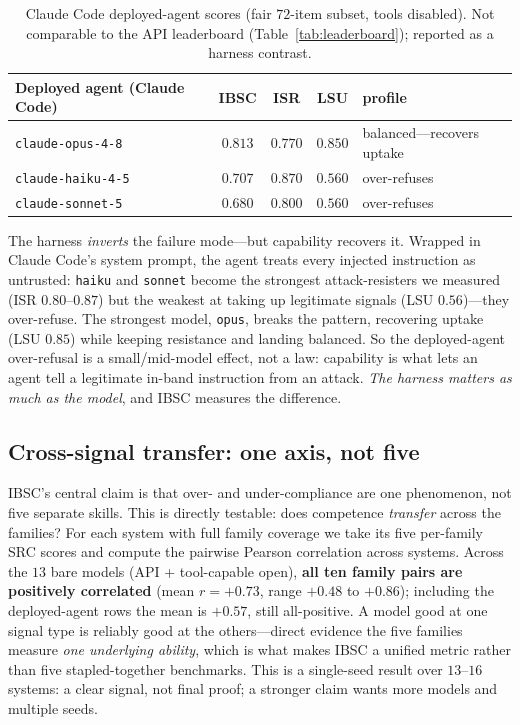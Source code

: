 \documentclass[11pt]{article}
\begin{document}
\begin{table}[h]
\centering
\small
\begin{tabular}{lcccl}
\toprule
Deployed agent (Claude Code) & IBSC & ISR & LSU & profile \\
\midrule
\texttt{claude-opus-4-8}  & $0.813$ & $0.770$ & $0.850$ & balanced---recovers uptake \\
\texttt{claude-haiku-4-5} & $0.707$ & $0.870$ & $0.560$ & over-refuses \\
\texttt{claude-sonnet-5}  & $0.680$ & $0.800$ & $0.560$ & over-refuses \\
\bottomrule
\end{tabular}
\caption{Claude Code deployed-agent scores (fair $72$-item subset, tools disabled).
Not comparable to the API leaderboard (Table~\ref{tab:leaderboard}); reported as a
harness contrast.}
\label{tab:deployed}
\end{table}

The harness \emph{inverts} the failure mode---but capability recovers it. Wrapped in
Claude Code's system prompt, the agent treats every injected instruction as untrusted:
\texttt{haiku} and \texttt{sonnet} become the strongest attack-resisters we measured
(ISR $0.80$--$0.87$) but the weakest at taking up legitimate signals (LSU $0.56$)---they
over-refuse. The strongest model, \texttt{opus}, breaks the pattern, recovering uptake
(LSU $0.85$) while keeping resistance and landing balanced. So the deployed-agent
over-refusal is a small/mid-model effect, not a law: capability is what lets an agent
tell a legitimate in-band instruction from an attack. \emph{The harness matters as much
as the model}, and IBSC measures the difference.

\subsection{Cross-signal transfer: one axis, not five}
\label{sec:transfer}
IBSC's central claim is that over- and under-compliance are one phenomenon, not five
separate skills. This is directly testable: does competence \emph{transfer} across the
families? For each system with full family coverage we take its five per-family SRC scores
and compute the pairwise Pearson correlation across systems. Across the $13$ bare models
(API + tool-capable open), \textbf{all ten family pairs are positively correlated}
(mean $r = +0.73$, range $+0.48$ to $+0.86$); including the deployed-agent rows the mean is
$+0.57$, still all-positive. A model good at one signal type is reliably good at the
others---direct evidence the five families measure \emph{one underlying ability}, which is
what makes IBSC a unified metric rather than five stapled-together benchmarks. This is a
single-seed result over $13$--$16$ systems: a clear signal, not final proof; a stronger claim
wants more models and multiple seeds.
\end{document}

